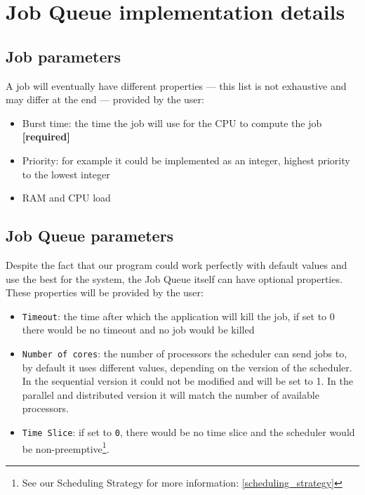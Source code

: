 \documentclass[a4paper,11pt]{article}
\begin{document}
\newpage

\section{Job Queue implementation details}\label{job_queue_implementation_details}

\subsection{Job parameters}\label{job_parameters}

A job will eventually have different properties --- this list is not exhaustive and may differ at the end --- provided by the user:

\begin{itemize}
\item Burst time: the time the job will use for the CPU to compute the job \textbf{[required]}
\item Priority: for example it could be implemented as an integer, highest priority to the lowest integer
\item RAM and CPU load
\end{itemize}

\subsection{Job Queue parameters}

Despite the fact that our program could work perfectly with default values and use the best for the system, the Job Queue itself can have optional properties. These properties will be provided by the user:
\begin{itemize}
\item \texttt{Timeout}: the time after which the application will kill the job, if set to 0 there would be no timeout and no job would be killed
\item \texttt{Number of cores}: the number of processors the scheduler can send jobs to, by default it uses different values, depending on the version of the scheduler. In the sequential version it could not be modified and will be set to 1. In the parallel and distributed version it will match the number of available processors.
\item \texttt{Time Slice}: if set to \texttt{0}, there would be no time slice and the scheduler would be non-preemptive\footnote{See our Scheduling Strategy for more information: \ref{scheduling_strategy}}.
\end{itemize}
\end{document}

